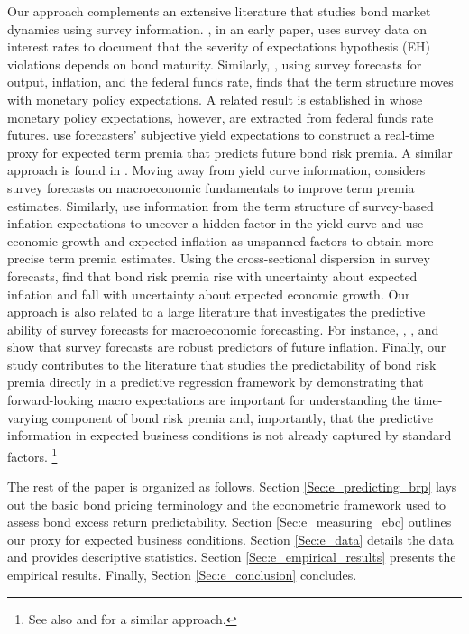 \documentclass[12pt,letterpaper,leqno,doublespacing]{article}
\begin{document}
Our approach complements an extensive literature that studies bond market dynamics using survey information. \cite{Froot1989}, in an early paper, uses survey data on interest rates to document that the severity of expectations hypothesis (EH) violations depends on bond maturity. Similarly, \cite{Chun2011}, using survey forecasts for output, inflation, and the federal funds rate, finds that the term structure moves with monetary policy expectations. A related result is established in \cite{AltavillaGiacominiConstantini2014} whose monetary policy expectations, however, are extracted from federal funds rate futures. \cite{DickSchmelingSchrimpf2013} use forecasters' subjective yield expectations to construct a real-time proxy for expected term premia that predicts future bond risk premia. A similar approach is found in \cite{PiazzesiSalomaoSchneider2013}. Moving away from yield curve information, \cite{Wright2011} considers survey forecasts on macroeconomic fundamentals to improve term premia estimates. Similarly, \cite{ChernovMueller2012} use information from the term structure of survey-based inflation expectations to uncover a hidden factor in the yield curve and \cite{JoslinPriebschSingleton2014} use economic growth and expected inflation as unspanned factors to obtain more precise term premia estimates. 
Using the cross-sectional dispersion in survey forecasts, \cite{BansalShaliastovich2013} find that bond risk premia rise with uncertainty about expected inflation and fall with uncertainty about expected economic growth. Our approach is also related to a large literature that investigates the predictive ability of survey forecasts for macroeconomic forecasting. For instance, \cite{FamaGibbons1984}, \cite{Thomas1999}, and \cite{AngBekaertWei2007} show that survey forecasts are robust predictors of future inflation. Finally, our study contributes to the literature that studies the predictability of bond risk premia directly in a predictive regression framework by demonstrating that forward-looking macro expectations are important for understanding the time-varying component of bond risk premia and, importantly, that the predictive information in expected business conditions is not already captured by standard factors.%
\footnote{See also \cite{CampbellDiebold2009} and \cite{SchmelingSchrimpf2011} for a similar approach.}
% 

The rest of the paper is organized as follows. Section \ref{Sec:e_predicting_brp} lays out the basic bond pricing terminology and the econometric framework used to assess bond excess return predictability. Section \ref{Sec:e_measuring_ebc} outlines our proxy for expected business conditions. Section \ref{Sec:e_data} details the data and provides descriptive statistics. Section \ref{Sec:e_empirical_results} presents the empirical results. Finally, Section \ref{Sec:e_conclusion} concludes.
\end{document}
